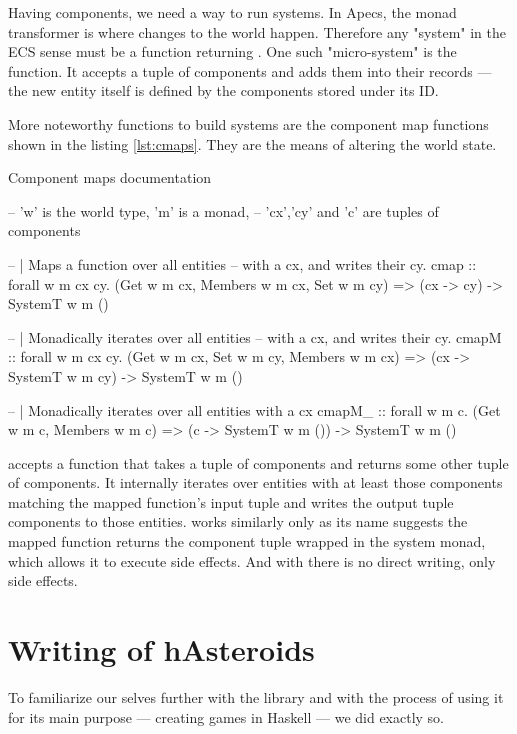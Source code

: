 \documentclass[
  digital, %
  color,   %
  table,   %
  oneside, %
  lof,     %
  lot,     %
]{fithesis3}
\begin{document}
Having components, we need a way to run systems. In Apecs,
the  monad transformer is where changes to the world happen.
Therefore any "system" in the ECS sense must be a function returning .
One such "micro-system" is the  function.
It accepts a tuple of components and adds them into
their records — the new entity itself is defined by the components stored under its ID.
More noteworthy functions to build systems are the component map functions
shown in the listing \ref{lst:cmaps}. They are the means of altering the world state.

\begin{listing}[H]
\caption{Component maps documentation\cite{apecsdocs}}
\begin{haskell}
-- 'w' is the world type, 'm' is a monad,
-- 'cx','cy' and 'c' are tuples of components

-- | Maps a function over all entities
--   with a cx, and writes their cy.
cmap :: forall w m cx cy.
    (Get w m cx, Members w m cx, Set w m cy) =>
    (cx -> cy) -> SystemT w m ()

-- | Monadically iterates over all entities
--   with a cx, and writes their cy.
cmapM :: forall w m cx cy.
    (Get w m cx, Set w m cy, Members w m cx) =>
    (cx -> SystemT w m cy) -> SystemT w m ()

-- | Monadically iterates over all entities with a cx
cmapM_ :: forall w m c.
    (Get w m c, Members w m c) =>
    (c -> SystemT w m ()) -> SystemT w m ()
\end{haskell}
\label{lst:cmaps}
\end{listing}

 accepts a function that takes a tuple of components
and returns some other tuple of components. It internally iterates
over entities with at least those components matching the mapped
function's input tuple and writes the output tuple components
to those entities.  works similarly
only as its name suggests the mapped function returns the component
tuple wrapped in the system monad, which allows it to execute side effects.
And with  there is no direct writing, only side effects.



\section{Writing of hAsteroids}
To familiarize our selves further with the library and with the process
of using it for its main purpose — creating games in Haskell — we did exactly so.
\end{document}
